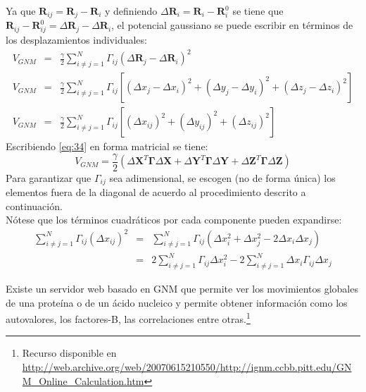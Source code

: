 Ya que $\textbf{R}_{ij}=\textbf{R}_{j}-\textbf{R}_{i}$ y definiendo $\Delta\textbf{R}_{i}=\textbf{R}_{i}-\textbf{R}_{i}^0$ se tiene que  $\textbf{R}_{ij}-\textbf{R}_{ij}^0=\Delta\textbf{R}_{j}-\Delta\textbf{R}_{i}$, el potencial gaussiano se puede escribir en t\'{e}rminos de los desplazamientos individuales:
\begin{eqnarray}\label{eq:34}
V_{GNM}&=&\frac{\gamma}{2}\sum_{i\neq j=1}^{N}\Gamma_{ij}\left( \Delta\textbf{R}_{j}-\Delta\textbf{R}_{i}\right)^2 \nonumber \\
V_{GNM}&=&\frac{\gamma}{2}\sum_{i\neq j=1}^{N}\Gamma_{ij}\left[\left(\Delta x_j-\Delta x_i \right)^2+\left(\Delta y_j-\Delta y_i \right)^2+\left(\Delta z_j-\Delta z_i \right)^2 \right] \nonumber \\
V_{GNM}&=&\frac{\gamma}{2}\sum_{i\neq j=1}^{N}\Gamma_{ij}\left[\left(\Delta x_{ij}\right)^2+\left(\Delta y_{ij}\right)^2+\left(\Delta z_{ij}\right)^2 \right]
\end{eqnarray}
Escribiendo \eqref{eq:34} en forma matricial se tiene:
\begin{equation}\label{eq:35}
V_{GNM}=\frac{\gamma}{2}\left(\Delta\mathbf{X}^T\mathbf{\Gamma}\Delta\mathbf{X}+\Delta\mathbf{Y}^T\mathbf{\Gamma}\Delta\mathbf{Y}+\Delta\mathbf{Z}^T\mathbf{\Gamma}\Delta\mathbf{Z} \right)
\end{equation}
Para garantizar que $\Gamma_{ij}$ sea adimensional, se escogen (no de forma \'{u}nica) los elementos fuera de la diagonal de acuerdo al procedimiento descrito a continuaci\'{o}n.\\

N\'{o}tese que los t\'{e}rminos cuadr\'{a}ticos por cada componente pueden expandirse:
\begin{eqnarray}\label{eq:36}
\sum_{i\neq j=1}^{N}\Gamma_{ij}\left(\Delta x_{ij}\right)^2&=&\sum_{i\neq j=1}^{N}\Gamma_{ij}\left(\Delta x_{i}^2+\Delta x_{j}^2-2\Delta x_{i}\Delta x_{j}\right) \nonumber \\
&=&2\sum_{i\neq j=1}^{N}\Gamma_{ij}\Delta x_{i}^2-2\sum_{i\neq j=1}^{N}\Delta x_{i}\Gamma_{ij}\Delta x_{j}
\end{eqnarray}

Existe un servidor web basado en GNM que permite ver los movimientos globales de una prote\'{i}na o de un \'{a}cido nucleico y permite obtener informaci\'{o}n como los autovalores, los factores-B, las correlaciones entre otras.\footnote{ Recurso disponible en \url{http://web.archive.org/web/20070615210550/http://ignm.ccbb.pitt.edu/GNM_Online_Calculation.htm}}

